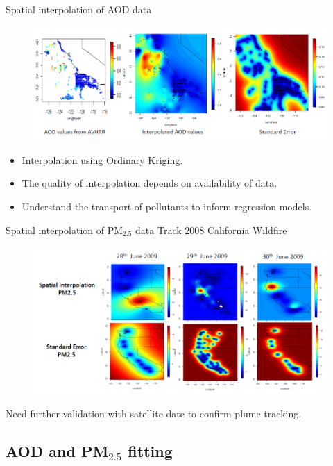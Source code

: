 \documentclass[notheorems,envcountsect,allowframebreaks,xcolor=svgnames,8pt]{beamer}
\def\cub{\color{uniblue}}
\begin{document}
\begin{frame}{Spatial interpolation of AOD data}
\begin{figure}
\centering
\includegraphics[scale=0.4]{figs/Spatial_1}
\end{figure}

\begin{itemize}
\item Interpolation using Ordinary Kriging.
\item The quality of interpolation depends on availability of data. 
\item Understand the transport of pollutants to inform regression models.
\end{itemize}
\end{frame}


\begin{frame}{Spatial interpolation of PM$_{2.5}$ data}
{\cub \large Track $2008$ California Wildfire}
\begin{figure}
\centering
\includegraphics[scale=0.45]{figs/Spatial2}
\end{figure}
Need further validation with satellite date to confirm plume tracking.
\end{frame}


\subsection{AOD and PM$_{2.5}$ fitting}
\end{document}
